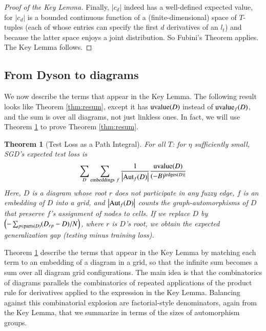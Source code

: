 \documentclass[anon,12pt]{colt2021} %
\newtheorem{thm}{Theorem}
\newcommand{\wrap}[1]{\left(#1\right)}
\newcommand{\wabs}[1]{\left|#1\right|}
\newcommand{\Aut}{\text{\textnormal{Aut}}}
\newcommand{\uvalue}{\text{\textnormal{uvalue}}}
\newcommand{\edges}{\text{\textnormal{edges}}}
\newcommand{\parts}{\text{\textnormal{parts}}}
\begin{document}
{\begin{proof}[Proof of the Key Lemma]
            Finally, $\wabs{c_d}$ indeed has a well-defined expected value, for
            $\wabs{c_d}$ is a bounded continuous function of a
            (finite-dimensional) space of $T$-tuples (each of whose entries can
            specify the first $d$ derivatives of an $l_t$) and because the
            latter space enjoys a joint distribution.  So Fubini's Theorem
            applies.  The Key Lemma follows.   
        \end{proof}

    \subsection{From Dyson to diagrams}                             \label{appendix:toward-diagrams}


        We now describe the terms that appear in the Key Lemma.  The following
        result looks like Theorem \ref{thm:resum}, except it has $\uvalue(D)$
        instead of $\uvalue_f(D)$, and the sum is over all diagrams, not just
        linkless ones.  In fact, we will use Theorem \ref{thm:pathint} to
        prove Theorem \ref{thm:resum}.

        \begin{thm}[Test Loss as a Path Integral] \label{thm:pathint}
            For all $T$: for $\eta$ sufficiently small, SGD's expected test
            loss is
            \begin{equation*}\label{eq:sgdcoef}
                \sum_{D}
                    \sum_{\text{embeddings}~f}
                    \frac{1}{\wabs{\Aut_f(D)}}
                \frac{\uvalue(D)}{(-B)^{|\edges(D)|}}
            \end{equation*}
            Here, $D$ is a diagram whose root $r$ does not participate in
            any fuzzy edge, $f$ is an embedding of $D$ into a grid, and
            $\wabs{\Aut_f(D)}$ counts the graph-automorphisms of $D$ that
            preserve $f$'s assignment of nodes to cells.
            If we replace $D$ by 
            $
                \wrap{-\sum_{p \in \parts(D)} (D_{rp} - D)/N}
            $, where $r$ is $D$'s root,
            we obtain the expected generalization gap (testing minus training loss).
        \end{thm}

        Theorem \ref{thm:pathint} describe the terms that appear in the Key
        Lemma by matching each term to an embedding of a diagram in a grid,
        so that the infinite sum becomes a sum over all diagram grid 
        configurations.  The main idea is that the combinatorics of diagrams
        parallels the combinatorics of repeated applications of the product
        rule for derivatives applied to the expression in the Key Lemma.
        Balancing against this combinatorial explosion are factorial-style
        denominators, again from the Key Lemma, that we summarize in terms of
        the sizes of automorphism groups.

}
\end{document}
